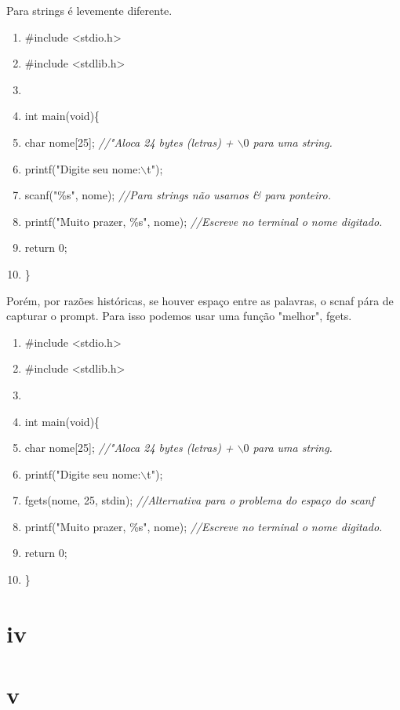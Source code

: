 \documentclass[12pt,a4paper]{article} %
\begin{document}
Para strings é levemente diferente.\\
\begin{enumerate}
\item \#include <stdio.h> 
\item \#include <stdlib.h>
\item 
\item int main(void)\{
\item \tabto{1.1cm}char nome[25]; \textit{//"Aloca 24 bytes (letras) + $\backslash 0$ para uma string.}
\item \tabto{1.1cm}printf("Digite seu nome:$\backslash$t");
\item \tabto{1.1cm}scanf("\%s", nome); \textit{//Para strings não usamos \& para ponteiro.}
\item \tabto{1.1cm}printf("Muito prazer, \%s", nome); \textit{//Escreve no terminal o nome digitado.}
\item \tabto{1.1cm}return 0;
\item \}
\end{enumerate}

Porém, por razões históricas, se houver espaço entre as palavras, o scnaf pára de capturar o prompt. Para isso podemos usar uma função "melhor", fgets.

\begin{enumerate}
\item \#include <stdio.h> 
\item \#include <stdlib.h>
\item 
\item int main(void)\{
\item \tabto{1.1cm}char nome[25]; \textit{//"Aloca 24 bytes (letras) + $\backslash 0$ para uma string.}
\item \tabto{1.1cm}printf("Digite seu nome:$\backslash$t");
\item \tabto{1.1cm}fgets(nome, 25, stdin); \textit{//Alternativa para o problema do espaço do scanf}
\item \tabto{1.1cm}printf("Muito prazer, \%s", nome); \textit{//Escreve no terminal o nome digitado.}
\item \tabto{1.1cm}return 0;
\item \}
\end{enumerate}

\section{iv}
\section{v}
\end{document}
